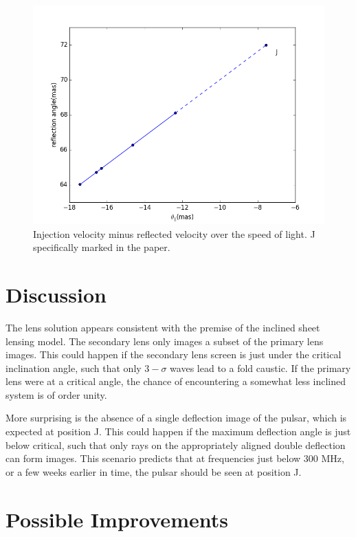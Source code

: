 \documentclass[useAMS,usenatbib]{mn2e}
\begin{document}
\begin{figure}
\centering
\includegraphics[width=1.0\textwidth,angle=0]{Reflection_angle.png}
\caption{Injection velocity minus reflected velocity over the speed of light. J specifically marked in the paper.}
\label{vtrans}
\end{figure}

\section{Discussion}

The lens solution appears consistent with the premise of the inclined
sheet lensing model\citep{2014MNRAS.442.3338P}.  The secondary lens
only images a subset of the primary lens images.  This could happen if
the secondary lens screen is just under the critical inclination
angle, such that only $3-\sigma$ waves lead to a fold caustic.  If the
primary lens were at a critical angle, the chance of encountering a
somewhat less inclined system is of order unity.

More surprising is the absence of a single deflection image of the
pulsar, which is expected at position J.  This could happen if the
maximum deflection angle is just below critical, such that only rays
on the appropriately aligned double deflection can form images.  This
scenario predicts that at frequencies just below $300$ MHz, or a few
weeks earlier in time, the pulsar should be seen at position J.

\section{Possible Improvements}
\end{document}
